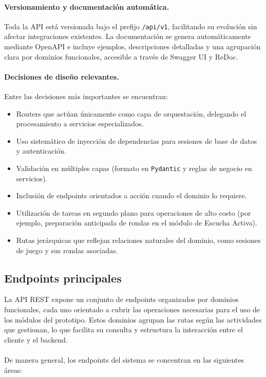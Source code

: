 \paragraph{Versionamiento y documentación automática.}
Toda la API está versionada bajo el prefijo \texttt{/api/v1}, facilitando su evolución sin afectar
integraciones existentes. La documentación se genera automáticamente mediante OpenAPI e incluye
ejemplos, descripciones detalladas y una agrupación clara por dominios funcionales, accesible a
través de Swagger UI y ReDoc.

\paragraph{Decisiones de diseño relevantes.}
Entre las decisiones más importantes se encuentran:
\begin{itemize}
    \item Routers que actúan únicamente como capa de orquestación, delegando el procesamiento a servicios especializados.
    \item Uso sistemático de inyección de dependencias para sesiones de base de datos y autenticación.
    \item Validación en múltiples capas (formato en \texttt{Pydantic} y reglas de negocio en servicios).
    \item Inclusión de endpoints orientados a acción cuando el dominio lo requiere.
    \item Utilización de tareas en segundo plano para operaciones de alto costo (por ejemplo, preparación anticipada de rondas en el módulo de Escucha Activa).
    \item Rutas jerárquicas que reflejan relaciones naturales del dominio, como sesiones de juego y sus rondas asociadas.
\end{itemize}

\subsection{Endpoints principales}

La API REST expone un conjunto de endpoints organizados por dominios funcionales,
cada uno orientado a cubrir las operaciones necesarias para el uso de los módulos del
prototipo. Estos dominios agrupan las rutas según las actividades que gestionan, lo
que facilita su consulta y estructura la interacción entre el cliente y el backend.
\\
\\
De manera general, los endpoints del sistema se concentran en las siguientes áreas:

